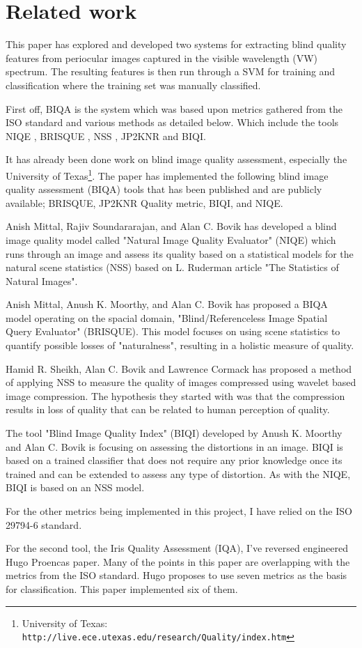 \section{Related work}
This paper has explored and developed two systems for extracting blind quality 
features from periocular images captured in the visible wavelength (VW)
spectrum.
The resulting features is then run through a SVM for training and classification
where the training set was manually classified.

First off, BIQA\cite{biqa} is the system which was based upon metrics gathered
from the ISO standard\cite{iso} and various methods as detailed below. Which
include the tools NIQE \cite{niqe}, BRISQUE \cite{brisque}, NSS \cite{nss},
JP2KNR \cite{jp2knr} and BIQI\cite{biqi}.

It has already been done work on blind image quality assessment, especially the 
University of Texas\footnote{University of Texas:
\texttt{http://live.ece.utexas.edu/research/Quality/index.htm}}.
The paper has implemented the following blind image quality assessment (BIQA)
tools that has been published and are publicly available; BRISQUE, JP2KNR
Quality metric, BIQI, and NIQE.

Anish Mittal, Rajiv Soundararajan, and Alan C. Bovik\cite{niqe} has developed a
blind image quality model called "Natural Image Quality Evaluator" (NIQE) which
runs through an image and assess its quality based on a statistical models for
the natural scene statistics (NSS) based on L. Ruderman article "The Statistics
of Natural Images"\cite{nss}.

Anish Mittal, Anush K. Moorthy, and Alan C. Bovik has proposed a BIQA model
operating on the spacial domain, "Blind/Referenceless Image Spatial Query
Evaluator" (BRISQUE)\cite{brisque}.  This model focuses on using scene
statistics to quantify possible losses of "naturalness", resulting in a holistic
measure of quality.

Hamid R. Sheikh, Alan C. Bovik and Lawrence Cormack \cite{jp2knr} has proposed a
method of applying NSS to measure the quality of images compressed using wavelet
based image compression.  The hypothesis they started with was that the
compression results in loss of quality that can be related to human perception
of quality.

The tool "Blind Image Quality Index" (BIQI)\cite{biqi} developed by Anush
K. Moorthy and Alan C. Bovik is focusing on assessing the distortions
in an image. BIQI is based on a trained classifier that does not require any
prior knowledge once its trained and can be extended to assess any type of
distortion.  As with the NIQE\cite{niqe}, BIQI is based on an NSS model.

For the other metrics being implemented in this project, I have relied on the
ISO 29794-6 standard\cite{iso}.

For the second tool, the Iris Quality Assessment (IQA)\cite{iqa}, I've reversed
engineered Hugo Proencas paper\cite{hugo}.  Many of the points in this
paper are overlapping with the metrics from the ISO standard.  Hugo proposes to
use seven metrics as the basis for classification. This paper implemented
six of them.


